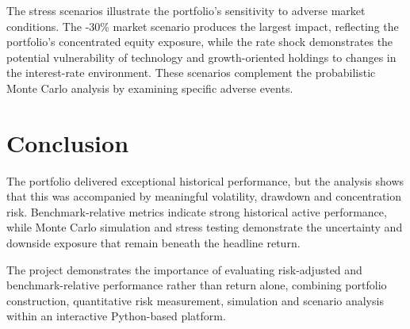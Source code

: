 \documentclass[10pt,a4paper]{article}
\begin{document}
The stress scenarios illustrate the portfolio's sensitivity to adverse market conditions. The -30\% market scenario produces the largest impact, reflecting the portfolio's concentrated equity exposure, while the rate shock demonstrates the potential vulnerability of technology and growth-oriented holdings to changes in the interest-rate environment. These scenarios complement the probabilistic Monte Carlo analysis by examining specific adverse events.

\section{Conclusion}

The portfolio delivered exceptional historical performance, but the analysis shows that this was accompanied by meaningful volatility, drawdown and concentration risk. Benchmark-relative metrics indicate strong historical active performance, while Monte Carlo simulation and stress testing demonstrate the uncertainty and downside exposure that remain beneath the headline return.

The project demonstrates the importance of evaluating risk-adjusted and benchmark-relative performance rather than return alone, combining portfolio construction, quantitative risk measurement, simulation and scenario analysis within an interactive Python-based platform.
\end{document}
